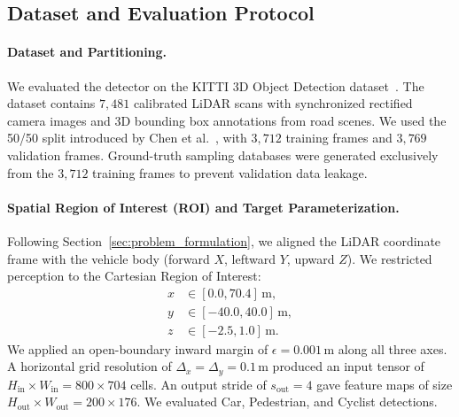 \subsection{Dataset and Evaluation Protocol}
\label{sec:dataset_and_metrics}

\paragraph{Dataset and Partitioning.}
We evaluated the detector on the KITTI 3D Object Detection dataset~\cite{geiger2012kitti}. The dataset contains $7{,}481$ calibrated LiDAR scans with synchronized rectified camera images and 3D bounding box annotations from road scenes. We used the 50/50 split introduced by Chen et al.~\cite{chen20153d}, with $3{,}712$ training frames and $3{,}769$ validation frames. Ground-truth sampling databases were generated exclusively from the $3{,}712$ training frames to prevent validation data leakage.

\paragraph{Spatial Region of Interest (ROI) and Target Parameterization.}
Following Section~\ref{sec:problem_formulation}, we aligned the LiDAR coordinate frame with the vehicle body (forward $X$, leftward $Y$, upward $Z$). We restricted perception to the Cartesian Region of Interest:
\begin{equation}
    \begin{aligned}
        x &\in [0.0, 70.4]\,\text{m}, \\
        y &\in [-40.0, 40.0]\,\text{m}, \\
        z &\in [-2.5, 1.0]\,\text{m}.
    \end{aligned}
\end{equation}
We applied an open-boundary inward margin of $\epsilon = 0.001\,\text{m}$ along all three axes. A horizontal grid resolution of $\Delta_x = \Delta_y = 0.1\,\text{m}$ produced an input tensor of $H_{\mathrm{in}} \times W_{\mathrm{in}} = 800 \times 704$ cells. An output stride of $s_{\mathrm{out}} = 4$ gave feature maps of size $H_{\mathrm{out}} \times W_{\mathrm{out}} = 200 \times 176$. We evaluated Car, Pedestrian, and Cyclist detections.

